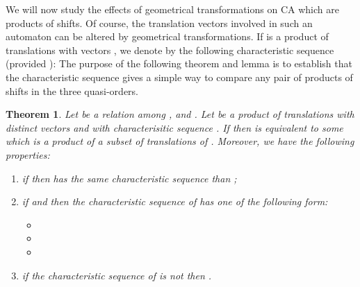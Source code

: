 \documentclass[a4paper]{elsarticle}
\def\qed{\relax\ifmmode\hskip2em \blacksquare\else\unskip\nobreak\hfill\hskip1em \fi}
\newtheorem{thm}{Theorem}[section]
\begin{document}
We will now study the effects of geometrical transformations on CA
which are products of shifts. Of course, the translation vectors
involved in such an automaton can be altered by geometrical
transformations.  If  is a product of translations with vectors
, we denote by  the following
characteristic sequence (provided ):
 The purpose of the following theorem
and lemma is to establish that the characteristic sequence gives a
simple way to compare any pair of products of shifts in the three
quasi-orders.

\begin{thm}
  \label{thm:shishi}
  Let  be a relation among ,  and
  .  Let  be a product of  translations
  with distinct vectors and with characterisitic sequence
  .  If
   then  is equivalent to some  which is
  a product of a subset of  translations of .  Moreover, we
  have the following properties: 
  \begin{enumerate}
  \item if  then  has the same characteristic sequence
    than ;
  \item if  and  then the characteristic sequence
    of  has one of the following form:
    \begin{itemize}
    \item 
    \item
      
    \item
      
    \end{itemize}
  \item if the characteristic sequence of  is not  then
    .
  \end{enumerate}

\end{thm}
\end{document}
